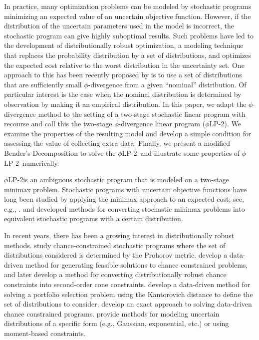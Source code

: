 \documentclass[ijoc,letterpaper]{informs3} %
\newcommand{\plp}{$\phi$LP-2}
\begin{document}
In practice, many optimization problems can be modeled by stochastic programs minimizing an expected value of an uncertain objective function.
However, if the distribution of the uncertain parameters used in the model is incorrect, the stochastic program can give highly suboptimal results.
Such problems have led to the development of distributionally robust optimization, a modeling technique that replaces the probability distribution by a set of distributions, and optimizes the expected cost relative to the worst distribution in the uncertainty set.
One approach to this has been recently proposed by \cite{bental2011robust} is to use a set of distributions that are sufficiently small $\phi$-divergence from a given ``nominal'' distribution.
Of particular interest is the case when the nominal distribution is determined by observation by making it an empirical distribution.
In this paper, we adapt the $\phi$-divergence method to the setting of a two-stage stochastic linear program with recourse and call this the two-stage $\phi$-divergence linear program (\plp). 
We examine the properties of the resulting model and develop a simple condition for assessing the value of collecting extra data.
Finally, we present a modified Bender's Decomposition to solve the \plp\ and illustrate some properties of \plp\ numerically.

\plp is an ambiguous stochastic program that is modeled on a two-stage minimax problem.
Stochastic programs with uncertain objective functions have long been studied by applying the minimax approach to an expected cost; see, e.g., \cite{zackova1966minimax,dupacova_87}.
\cite{shapiro2002minimax} and \cite{shapiro2004class} developed methods for converting stochastic minimax problems into equivalent stochastic programs with a certain distribution.

In recent years, there has been a growing interest in distributionally robust methods.
\cite{erdogan2006ambiguous} study chance-constrained stochastic programs where the set of distributions considered is determined by the Prohorov metric.
\cite{calafiore2005uncertain} develop a data-driven method for generating feasible solutions to chance constrained problems, and later \cite{calafiore2006distributionally} develop a method for converting distributionally robust chance constraints into second-order cone constraints.
\cite{pflug2007ambiguity} develop a data-driven method for solving a portfolio selection problem using the Kantorovich distance to define the set of distributions to consider.
\cite{jiang2012data} develop an exact approach to solving data-driven chance constrained programs.
\cite{delage2010distributionally} provide methods for modeling uncertain distributions of a specific form (e.g., Gaussian, exponential, etc.) or using moment-based constraints.
\end{document}
